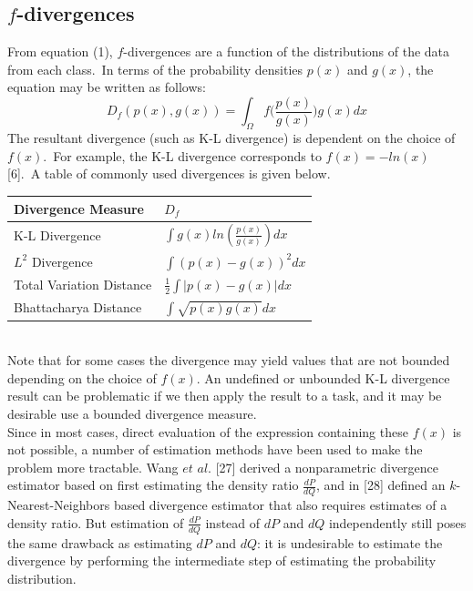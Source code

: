 \documentclass{article}
\begin{document}
	\subsection{\small $f$-divergences}
	\indent From equation (1), $f$-divergences are a function of the distributions of the data from each class.\ In terms of the probability densities $p(x)$ and $g(x)$, the equation may be written as follows:\begin{equation}
		 D_f(p({x}),g({x})) = \int_{\Omega} f\bigg(\frac{p({x})}{g({x})}\bigg)g({x})dx
	\end{equation}The resultant divergence (such as K-L divergence) is dependent on the choice of $f(x)$.\ For example, the K-L divergence corresponds to $f(x) = -ln(x)$ [6].\  A table of commonly used divergences is given below.
	\\ [0.5ex]
	\begin{tabular}[!h]{ |p{5cm}||p{4cm}|  }
		\hline
		Divergence Measure & $D_f$ \\ 
		\hline\hline
		K-L Divergence 	& $\int g(x)ln(\frac{p(x)}{g(x)})dx$ \\
		
		$L^2$ Divergence & $ \int (p(x)-g(x))^2dx$ \\
		
		Total Variation Distance & $ \frac{1}{2}\int \vert p(x)-g(x)\vert dx$ \\
		
		Bhattacharya Distance & $\int\sqrt{p(x)g(x)}dx$\\ 
		\hline 		
	\end{tabular}	
	\\ [0.5ex]
	\indent Note that for some cases the divergence may yield values that are not bounded depending on the choice of $f(x)$. An undefined or unbounded K-L divergence result can be problematic if we then apply the result to a task, and it may be desirable use a bounded divergence measure. 	
	\\ [0.5ex]
	\indent Since in most cases, direct evaluation of the expression containing these $f(x)$ is not possible, a number of estimation methods have been used to make the problem more tractable. Wang $et$ $al$. [27] derived a nonparametric divergence estimator based on first estimating the density ratio $\frac{dP}{dQ}$, and in [28] defined an  $k$-Nearest-Neighbors based divergence estimator that also requires estimates of a density ratio. But estimation of $\frac{dP}{dQ}$ instead of $dP$ and $dQ$ independently still poses the same drawback as estimating $dP$ and $dQ$: it is undesirable to estimate the divergence by performing the intermediate step of estimating the probability distribution.
\end{document}
